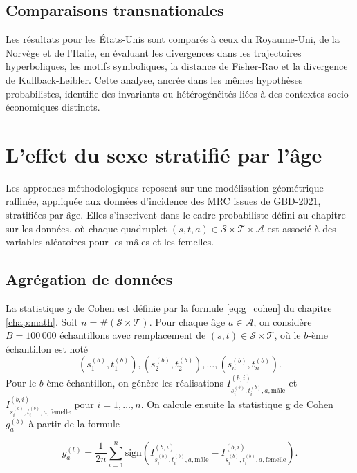 \subsection{Comparaisons transnationales}

Les résultats pour les États-Unis sont comparés à ceux du Royaume-Uni, de la Norvège et de l'Italie, en évaluant les divergences dans les trajectoires hyperboliques, les motifs symboliques, la distance de Fisher-Rao et la divergence de Kullback-Leibler. Cette analyse, ancrée dans les mêmes hypothèses probabilistes, identifie des invariants ou hétérogénéités liées à des contextes socio-économiques distincts.

\section{L'effet du sexe stratifié par l'âge}

Les approches méthodologiques reposent sur une modélisation géométrique raffinée, appliquée aux données d'incidence des MRC issues de GBD-2021, stratifiées par âge. Elles s'inscrivent dans le cadre probabiliste défini au chapitre sur les données, où chaque quadruplet $(s,t,a) \in \mathcal{S} \times \mathcal{T} \times \mathcal{A}$ est associé à des variables aléatoires pour les mâles et les femelles.

\subsection{Agrégation de données}

La statistique $g$ de Cohen est définie par la formule \eqref{eq:g_cohen} du chapitre \ref{chap:math}. Soit $n = \# (\mathcal{S} \times \mathcal{T})$. Pour chaque âge $a \in \mathcal{A}$, on considère $B = 100\,000$ échantillons avec remplacement de $(s,t) \in \mathcal{S} \times \mathcal{T}$, où le $b$-ème échantillon est noté
\[
(s_1^{(b)}, t_1^{(b)}), (s_2^{(b)}, t_2^{(b)}), \dots, (s_n^{(b)}, t_n^{(b)}).
\]
Pour le $b$-ème échantillon, on génère les réalisations $I_{s_i^{(b)}, t_i^{(b)}, a, \mathrm{mâle}}^{(b,i)}$ et $I_{s_i^{(b)}, t_i^{(b)}, a, \mathrm{femelle}}^{(b,i)}$ pour $i = 1, \dots, n$. On calcule ensuite la statistique g de Cohen $g_a^{(b)}$ à partir de la formule 

\begin{equation}
	g_a^{(b)} = \frac{1}{2n}\sum_{i=1}^n \mathrm{sign} \left(I_{s_i^{(b)}, t_i^{(b)}, a, \mathrm{mâle}}^{(b,i)} -
	I_{s_i^{(b)}, t_i^{(b)}, a, \mathrm{femelle}}^{(b,i)}
	 \right).
\end{equation}

